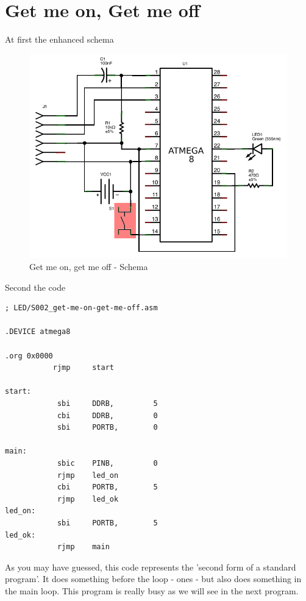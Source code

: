 \section{Get me on, Get me off}

At first the enhanced schema

\begin{figure}[htbp]
  \centering
  \includegraphics[width=120mm]{LED/S002_get-me-on-get-me-off_Circuit_schema.png}
  \caption{Get me on, get me off - Schema}
  \label{atmega8-get-me-on-get-me-off-schema}
\end{figure}


Second the code


\begin{lstlisting}
; LED/S002_get-me-on-get-me-off.asm

.DEVICE atmega8

.org 0x0000
           rjmp     start

start:
            sbi     DDRB,         5
            cbi     DDRB,         0
            sbi     PORTB,        0

main:
            sbic    PINB,         0
            rjmp    led_on
            cbi     PORTB,        5
            rjmp    led_ok
led_on:
            sbi     PORTB,        5
led_ok:
            rjmp    main
\end{lstlisting}

As you may have guessed, this code represents the 'second form of a standard program'. It does something before the loop - ones - but also does something in the main loop. This program is really busy as we will see in the next program.

